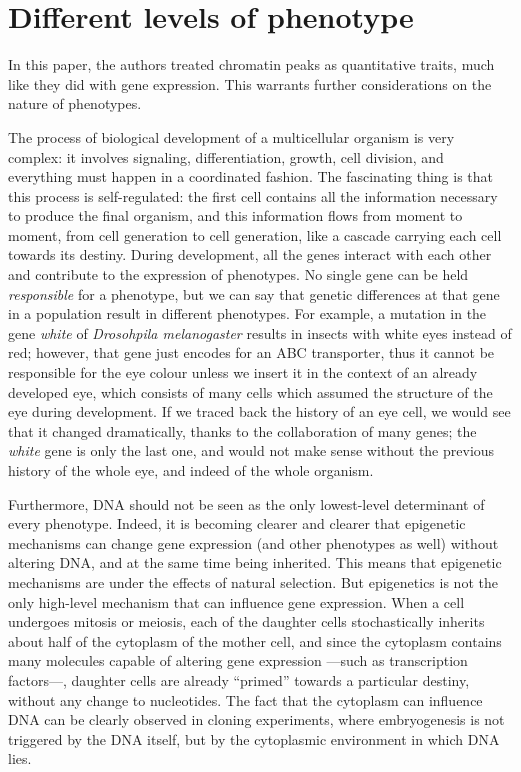 \documentclass[../main.tex]{subfiles}
\begin{document}
\section{Different levels of phenotype}

In this paper, the authors treated chromatin peaks as quantitative 
traits, much like they did with gene expression. This warrants further 
considerations on the nature of phenotypes.

The process of biological development of a multicellular organism is 
very complex: it involves signaling, differentiation, growth, cell 
division, and everything must happen in a coordinated fashion. The 
fascinating thing is that this process is self-regulated: the first cell 
contains all the information necessary to produce the final organism, 
and this information flows from moment to moment, from cell generation 
to cell generation, like a cascade carrying each cell towards its 
destiny. During development, all the genes interact with each other and 
contribute to the expression of phenotypes. No single gene can be held 
\textit{responsible} for a phenotype, but we can say that genetic 
differences at that gene in a population result in different 
phenotypes\autocite{Griffiths2000}. For example, a mutation in the gene 
\textit{white} of \textit{Drosohpila melanogaster} results in insects 
with white eyes instead of red; however, that gene just encodes for an 
ABC transporter\autocite{Mackenzie1999}, thus it cannot be responsible for 
the eye colour unless we insert it in the context of an already 
developed eye, which consists of many cells which assumed the structure 
of the eye during development. If we traced back the history of an eye 
cell, we would see that it changed dramatically, thanks to the 
collaboration of many genes; the \textit{white} gene is only the last 
one, and would not make sense without the previous history of the whole 
eye, and indeed of the whole organism.

Furthermore, DNA should not be seen as the only lowest-level determinant 
of every phenotype. Indeed, it is becoming clearer and clearer that 
epigenetic mechanisms can change gene expression (and other phenotypes 
as well) without altering DNA, and at the same time being inherited. 
This means that epigenetic mechanisms are under the effects of natural 
selection\autocite{Hunter2009}. But epigenetics is not the only high-level 
mechanism that can influence gene expression. When a cell undergoes 
mitosis or meiosis, each of the daughter cells stochastically inherits 
about half of the cytoplasm of the mother cell, and since the cytoplasm 
contains many molecules capable of altering gene expression ---such as 
transcription factors---, daughter cells are already \enquote{primed} 
towards a particular destiny, without any change to nucleotides. The 
fact that the cytoplasm can influence DNA can be clearly observed in 
cloning experiments, where embryogenesis is not triggered by the DNA 
itself, but by the cytoplasmic environment in which DNA lies.
\end{document}
